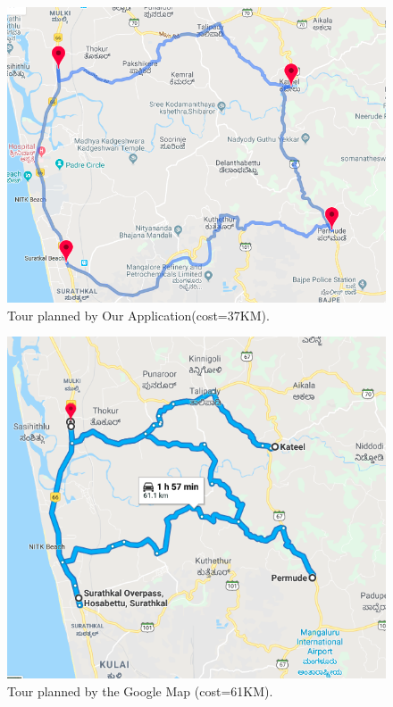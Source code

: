 \documentclass[conference]{IEEEtran}
\begin{document}
\begin{figure}[htbp]
\centerline{\includegraphics[width=\columnwidth]{tspResultApp.png}}
\caption{Tour planned by Our Application(cost=37KM).}
\label{fig3}
\end{figure}


\begin{figure}[htbp]
\centerline{\includegraphics[width=\columnwidth]{tspResultGoogle.png}}
\caption{Tour planned by the Google Map (cost=61KM).}
\label{fig4}
\end{figure}
\end{document}
